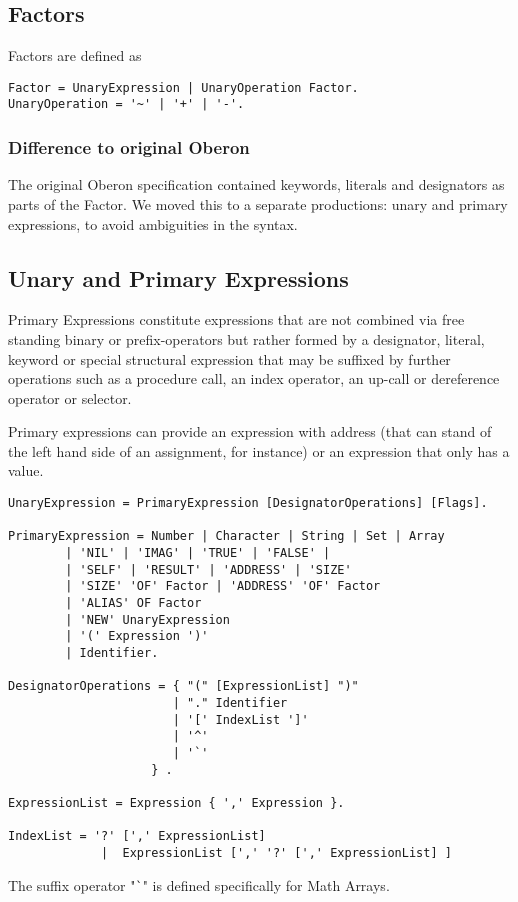 \documentclass[a4wide,11pt]{article}
\begin{document}
\subsection{Factors}

Factors are defined as
\begin{lstlisting}[style=ebnf]
Factor = UnaryExpression | UnaryOperation Factor.
UnaryOperation = '~' | '+' | '-'.
\end{lstlisting}


\begin{annotation}
\subsubsection{Difference to original Oberon}
The original Oberon specification contained keywords, literals and designators as parts of the Factor.
We moved this to a separate productions: unary and primary expressions, to avoid ambiguities in the syntax.
\end{annotation}

\subsection{Unary and Primary Expressions}

Primary Expressions constitute expressions that are not combined via free standing binary or prefix-operators but rather formed by a designator, literal, keyword or special structural expression that may be suffixed by further operations such as a procedure call, an index operator, an up-call or dereference operator or selector.

Primary expressions can provide an expression with address (that can stand of the left hand side of an assignment, for instance) or an expression that only has a value.

\begin{lstlisting}[style=ebnf]
UnaryExpression = PrimaryExpression [DesignatorOperations] [Flags].

PrimaryExpression = Number | Character | String | Set | Array
        | 'NIL' | 'IMAG' | 'TRUE' | 'FALSE' |
        | 'SELF' | 'RESULT' | 'ADDRESS' | 'SIZE'
        | 'SIZE' 'OF' Factor | 'ADDRESS' 'OF' Factor
        | 'ALIAS' OF Factor
        | 'NEW' UnaryExpression
        | '(' Expression ')'
        | Identifier.

DesignatorOperations = { "(" [ExpressionList] ")"
                       | "." Identifier
                       | '[' IndexList ']'
                       | '^'
                       | '`'
                    } .

ExpressionList = Expression { ',' Expression }.

IndexList = '?' [',' ExpressionList]
             |  ExpressionList [',' '?' [',' ExpressionList] ]
\end{lstlisting}
The suffix operator "\verb~`~" is defined specifically for Math Arrays.
\end{document}
